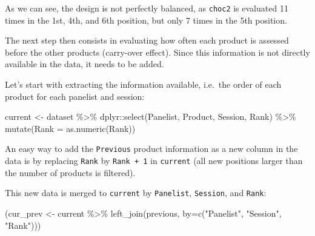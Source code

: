 \documentclass[
]{book}
\newenvironment{Shaded}{\begin{snugshade}}{\end{snugshade}}
\newcommand{\AttributeTok}[1]{\textcolor[rgb]{0.77,0.63,0.00}{#1}}
\newcommand{\DecValTok}[1]{\textcolor[rgb]{0.00,0.00,0.81}{#1}}
\newcommand{\FunctionTok}[1]{\textcolor[rgb]{0.00,0.00,0.00}{#1}}
\newcommand{\NormalTok}[1]{#1}
\newcommand{\OtherTok}[1]{\textcolor[rgb]{0.56,0.35,0.01}{#1}}
\newcommand{\SpecialCharTok}[1]{\textcolor[rgb]{0.00,0.00,0.00}{#1}}
\newcommand{\StringTok}[1]{\textcolor[rgb]{0.31,0.60,0.02}{#1}}
\begin{document}
As we can see, the design is not perfectly balanced, as \texttt{choc2} is evaluated 11 times in the 1st, 4th, and 6th position, but only 7 times in the 5th position.

The next step then consists in evaluating how often each product is assessed before the other products (carry-over effect). Since this information is not directly available in the data, it needs to be added.

Let's start with extracting the information available, i.e.~the order of each product for each panelist and session:

\begin{Shaded}
\begin{Highlighting}[]
\NormalTok{current }\OtherTok{\textless{}{-}}\NormalTok{ dataset }\SpecialCharTok{\%\textgreater{}\%} 
\NormalTok{  dplyr}\SpecialCharTok{::}\FunctionTok{select}\NormalTok{(Panelist, Product, Session, Rank) }\SpecialCharTok{\%\textgreater{}\%} 
  \FunctionTok{mutate}\NormalTok{(}\AttributeTok{Rank =} \FunctionTok{as.numeric}\NormalTok{(Rank))}
\end{Highlighting}
\end{Shaded}

An easy way to add the \texttt{Previous} product information as a new column in the data is by replacing \texttt{Rank} by \texttt{Rank\ +\ 1} in \texttt{current} (all new positions larger than the number of products is filtered).

\begin{Shaded}
\end{Shaded}

This new data is merged to \texttt{current} by \texttt{Panelist}, \texttt{Session}, and \texttt{Rank}:

\begin{Shaded}
\begin{Highlighting}[]
\NormalTok{(cur\_prev }\OtherTok{\textless{}{-}}\NormalTok{ current }\SpecialCharTok{\%\textgreater{}\%} 
  \FunctionTok{left\_join}\NormalTok{(previous, }\AttributeTok{by=}\FunctionTok{c}\NormalTok{(}\StringTok{"Panelist"}\NormalTok{, }\StringTok{"Session"}\NormalTok{, }\StringTok{"Rank"}\NormalTok{)))}
\end{Highlighting}
\end{Shaded}
\end{document}
